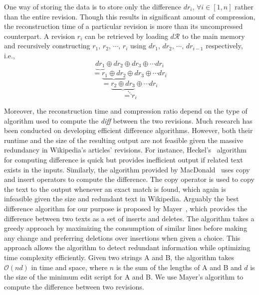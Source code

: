 \documentclass[acmsmall]{acmart}
\begin{document}
One way of storing the data is to store only the difference $dr_i$, $\forall i \in \left[1, n\right]$ rather than the entire revision. Though this results in significant amount of compression, the reconstruction time of a particular revision is more than its uncompressed counterpart. A revision $r_i$ can be retrieved by loading $d\mathcal{R}$ to the main memory and recursively constructing $r_1$, $r_2$, $\cdots$, $r_i$ using $dr_1$, $dr_2$, $\cdots$, $dr_{i-1}$ respectively, i.e.,
\begin{equation*}
\underbrace{dr_1} \oplus dr_2 \oplus dr_3 \oplus \cdots dr_i
\end{equation*}
\begin{equation*}
  =\underbrace{r_1 \oplus dr_2} \oplus dr_3 \oplus \cdots dr_i
\end{equation*}
\begin{equation*}
=\underbrace{r_2 \oplus dr_3} \oplus \cdots dr_i
\end{equation*}
\begin{equation*}
    \ddots
\end{equation*}
\begin{equation*}
    = r_i
\end{equation*}

Moreover, the reconstruction time and compression ratio depend on the type of algorithm used to compute the \emph{diff} between the two revisions. Much research has been conducted on developing efficient difference algorithms. However, both their runtime and the size of the resulting output are not feasible given the massive redundancy in Wikipedia's articles' revisions. For instance, Heckel's~\cite{heckel1978technique} algorithm for computing difference is quick but provides inefficient output if related text exists in the inputs. Similarly, the algorithm provided by MacDonald~\cite{macdonald2000file} uses copy and insert operators to compute the difference. The copy operator is used to copy the text to the output whenever an exact match is found, which again is infeasible given the size and redundant text in Wikipedia. Arguably the best difference algorithm for our purpose is proposed by Mayer~\cite{myers1986ano}, which provides the difference between two texts as a set of inserts and deletes. The algorithm takes a greedy approach by maximizing the consumption of similar lines before making any change and preferring deletions over insertions when given a choice. This approach allows the algorithm to detect redundant information while optimizing time complexity efficiently. Given two strings A and B, the algorithm takes $\mathcal{O} (nd)$ in time and space, where $n$ is the sum of the lengths of A and B and $d$ is the size of the minimum edit script for A and B. We use Mayer's algorithm to compute the difference between two revisions.
    
\end{document}

